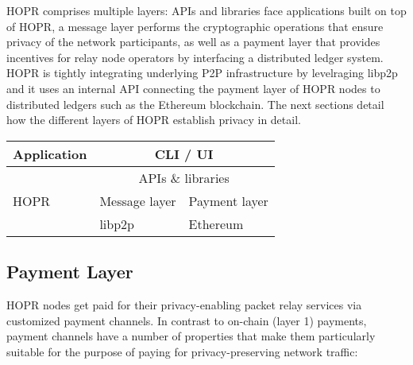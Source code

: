 \documentclass{article}
\begin{document}
HOPR comprises multiple layers: APIs and libraries face applications built on top of HOPR, a message layer performs the cryptographic operations that ensure privacy of the network participants, as well as a payment layer that provides incentives for relay node operators by interfacing a distributed ledger system. HOPR is tightly integrating underlying P2P infrastructure by levelraging libp2p and it uses an internal API connecting the payment layer of HOPR nodes to distributed ledgers such as the Ethereum blockchain. The next sections detail how the different layers of HOPR establish privacy in detail.

\setlength{\tabcolsep}{1em} %
{\renewcommand{\arraystretch}{2}%
\begin{center}
    \begin{tabular}{|l|l|l|}
        \hline
        Application & \multicolumn{2}{|c|}{CLI / UI}\\
        \hline
        \multirow{3}{*}{HOPR} & \multicolumn{2}{|c|}{APIs \& libraries}\\
        \cline{2-3}
         & Message layer & Payment layer\\
        \hline
        Infrastructure & libp2p & Ethereum\\
        \hline
    \end{tabular}
\end{center}
}

\subsection{Payment Layer}
HOPR nodes get paid for their privacy-enabling packet relay services via customized payment channels. In contrast to on-chain (layer 1) payments, payment channels have a number of properties that make them particularly suitable for the purpose of paying for privacy-preserving network traffic:
\end{document}
